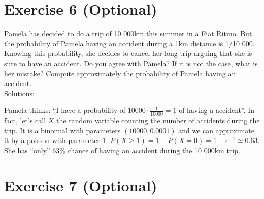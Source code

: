 \documentclass[12pt,thmsa]{article}\usepackage[]{graphicx}\usepackage[]{color}
\begin{document}
\section*{Exercise 6 (Optional)}

Pamela has decided to do a trip of 10 000km this summer in a Fiat Ritmo. But the probability of Pamela having an accident during a 1km distance is 1/10 000.
Knowing this probability, she decides to cancel her long trip arguing that she is sure to have an accident. Do you agree with Pamela?
If it is not the case, what is her mistake? Compute approximately the probability of Pamela having an accident.\\

\noindent Solutions:

Pamela thinks: ``I have a probability of $10 000 \cdot \frac{1}{10 000}=1$ of having a accident''.
In fact, let's call $X$ the random variable counting the number of accidents during the trip.
It is a binomial with parameters $(10 000, 0.0001)$ and we can approximate it by a poisson with parameter $1$.
$P(X \geq 1)=1-P(X=0)=1-e^{-1}\simeq 0.63$.
She has ``only'' 63\% chance of having an accident during the 10 000km trip.

\section*{Exercise 7 (Optional)}
\end{document}
